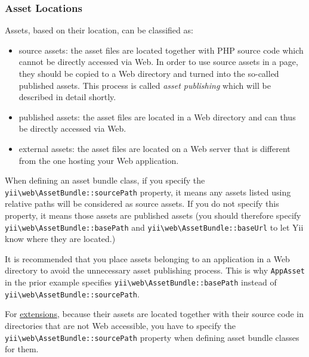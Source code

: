 \subsubsection{Asset Locations \label{structure-assets.md::asset-locations}}
Assets, based on their location, can be classified as:

\begin{itemize}
\item source assets: the asset files are located together with PHP source code which cannot be directly accessed via Web.
In order to use source assets in a page, they should be copied to a Web directory and turned into the so-called
published assets. This process is called \textit{asset publishing} which will be described in detail shortly.
\item published assets: the asset files are located in a Web directory and can thus be directly accessed via Web.
\item external assets: the asset files are located on a Web server that is different from the one hosting your Web
application.
\end{itemize}
When defining an asset bundle class, if you specify the \texttt{yii{\allowbreak{}\textbackslash}web{\allowbreak{}\textbackslash}AssetBundle\allowbreak{}::\allowbreak{}sourcePath} property,
it means any assets listed using relative paths will be considered as source assets. If you do not specify this property,
it means those assets are published assets (you should therefore specify \texttt{yii{\allowbreak{}\textbackslash}web{\allowbreak{}\textbackslash}AssetBundle\allowbreak{}::\allowbreak{}basePath} and
\texttt{yii{\allowbreak{}\textbackslash}web{\allowbreak{}\textbackslash}AssetBundle\allowbreak{}::\allowbreak{}baseUrl} to let Yii know where they are located.)

It is recommended that you place assets belonging to an application in a Web directory to avoid the unnecessary asset
publishing process. This is why \lstinline|AppAsset| in the prior example specifies \texttt{yii{\allowbreak{}\textbackslash}web{\allowbreak{}\textbackslash}AssetBundle\allowbreak{}::\allowbreak{}basePath}
instead of \texttt{yii{\allowbreak{}\textbackslash}web{\allowbreak{}\textbackslash}AssetBundle\allowbreak{}::\allowbreak{}sourcePath}.

For \hyperref[structure-extensions.md]{extensions}, because their assets are located together with their source code
in directories that are not Web accessible, you have to specify the \texttt{yii{\allowbreak{}\textbackslash}web{\allowbreak{}\textbackslash}AssetBundle\allowbreak{}::\allowbreak{}sourcePath}
property when defining asset bundle classes for them.

